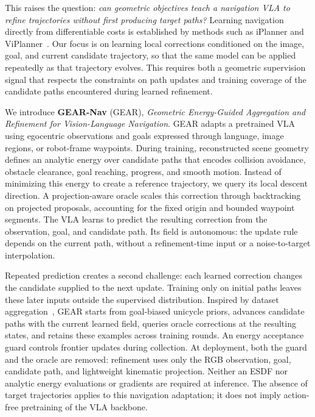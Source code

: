 \documentclass[letterpaper, 10 pt, conference]{ieeeconf}  %
\begin{document}
This raises the question: \emph{can geometric objectives teach a navigation
VLA to refine trajectories without first producing target paths?}
Learning navigation directly from differentiable costs is established by
methods such as iPlanner and ViPlanner~\cite{iplanner,viplanner}.
Our focus is on learning local corrections conditioned on the image,
goal, and current candidate trajectory, so that the same model can be
applied repeatedly as that trajectory evolves. This requires both a
geometric supervision signal that respects the constraints on path
updates and training coverage of the candidate paths encountered during
learned refinement.

We introduce \textbf{GEAR-Nav} (GEAR), \emph{Geometric Energy-Guided
Aggregation and Refinement for Vision-Language Navigation}. GEAR adapts a
pretrained VLA using egocentric observations and goals expressed through
language, image regions, or robot-frame waypoints. During training,
reconstructed scene geometry defines an analytic energy over candidate
paths that encodes collision avoidance, obstacle clearance, goal reaching,
progress, and smooth motion. Instead of minimizing this energy to create
a reference trajectory, we query its local descent direction. A
projection-aware oracle scales this correction through backtracking on
projected proposals, accounting for the fixed origin and bounded waypoint
segments. The VLA learns to predict the resulting correction from the
observation, goal, and candidate path. Its field is autonomous: the update
rule depends on the current path, without a refinement-time input or a
noise-to-target interpolation.

Repeated prediction creates a second challenge: each learned correction
changes the candidate supplied to the next update. Training only on
initial paths leaves these later inputs outside the supervised
distribution. Inspired by dataset aggregation~\cite{dagger}, GEAR starts
from goal-biased unicycle priors, advances candidate paths with the
current learned field, queries oracle corrections at the resulting
states, and retains these examples across training rounds. An energy
acceptance guard controls frontier updates during collection. At
deployment, both the guard and the oracle are removed: refinement uses
only the RGB observation, goal, candidate path, and lightweight kinematic
projection. Neither an ESDF nor analytic energy evaluations or gradients
are required at inference. The absence of target trajectories applies to
this navigation adaptation; it does not imply action-free pretraining of
the VLA backbone.
\end{document}
